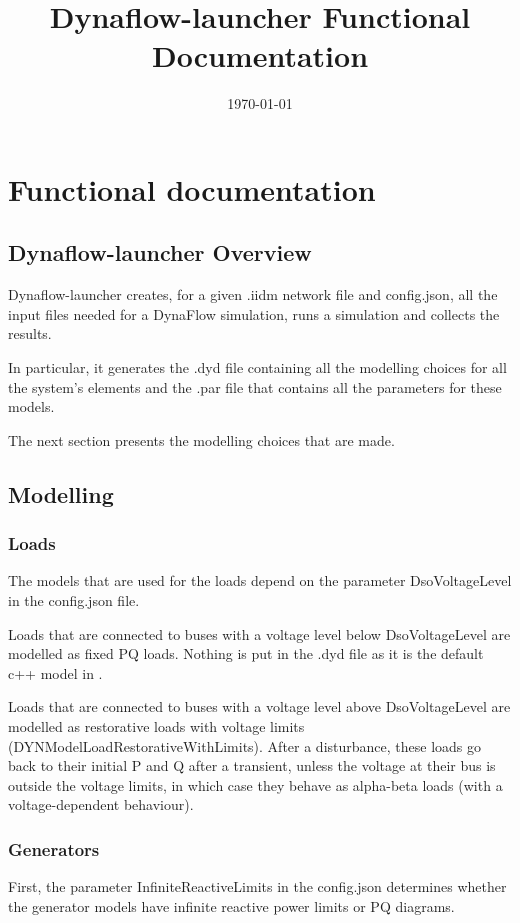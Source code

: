 \documentclass[a4paper, 12pt]{report}
\begin{document}
\title{Dynaflow-launcher Functional Documentation}
\date\today

\maketitle
\tableofcontents

\chapter{Functional documentation}

\section[Dynaflow-launcher Overview]{Dynaflow-launcher Overview}
Dynaflow-launcher creates, for a given .iidm network file and config.json, all the input files needed for a DynaFlow simulation, runs a simulation and collects the results.
\par In particular, it generates the .dyd file containing all the modelling choices for all the system's elements and the .par file that contains all the parameters for these models.
\par The next section presents the modelling choices that are made.

\section{Modelling}

\subsection{Loads}
The models that are used for the loads depend on the parameter DsoVoltageLevel in the config.json file.
\par Loads that are connected to buses with a voltage level below DsoVoltageLevel are modelled as fixed PQ loads. Nothing is put in the .dyd file as it is the default c++ model in \Dynawo.
\par Loads that are connected to buses with a voltage level above DsoVoltageLevel are modelled as restorative loads with voltage limits (DYNModelLoadRestorativeWithLimits). After a disturbance, these loads go back to their initial P and Q after a transient, unless the voltage at their bus is outside the voltage limits, in which case they behave as alpha-beta loads (with a voltage-dependent behaviour).

\subsection{Generators}
First, the parameter InfiniteReactiveLimits in the config.json determines whether the generator models have infinite reactive power limits or PQ diagrams.
\end{document}
